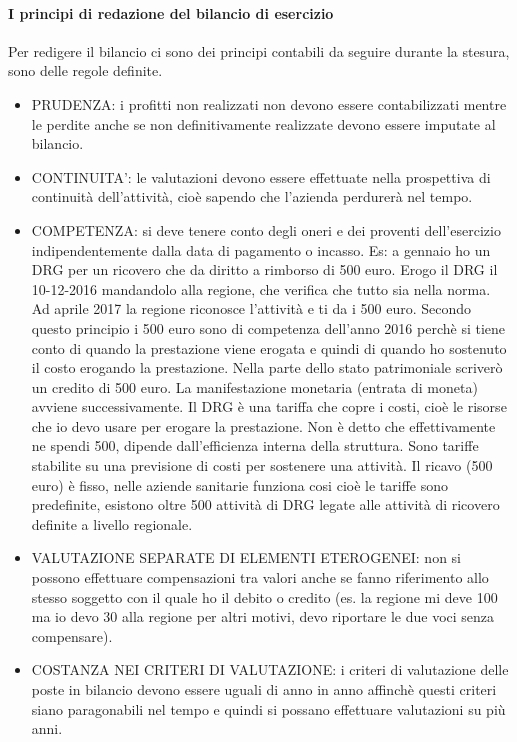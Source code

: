 \paragraph{I principi di redazione del bilancio di esercizio}

Per redigere il bilancio ci sono dei principi contabili da seguire
durante la stesura, sono delle regole definite.

\begin{itemize}
\item
  PRUDENZA: i profitti non realizzati non devono essere contabilizzati
  mentre le perdite anche se non definitivamente realizzate devono
  essere imputate al bilancio.
\item
  CONTINUITA': le valutazioni devono essere effettuate nella prospettiva
  di continuità dell'attività, cioè sapendo che l'azienda perdurerà nel
  tempo.
\item
  COMPETENZA: si deve tenere conto degli oneri e dei proventi
  dell'esercizio indipendentemente dalla data di pagamento o incasso.
  Es: a gennaio ho un DRG per un ricovero che da diritto a rimborso di
  500 euro. Erogo il DRG il 10-12-2016 mandandolo alla regione, che
  verifica che tutto sia nella norma. Ad aprile 2017 la regione
  riconosce l'attività e ti da i 500 euro. Secondo questo principio i
  500 euro sono di competenza dell'anno 2016 perchè si tiene conto di
  quando la prestazione viene erogata e quindi di quando ho sostenuto il
  costo erogando la prestazione. Nella parte dello stato patrimoniale
  scriverò un credito di 500 euro. La manifestazione monetaria (entrata
  di moneta) avviene successivamente. Il DRG è una tariffa che copre i
  costi, cioè le risorse che io devo usare per erogare la prestazione.
  Non è detto che effettivamente ne spendi 500, dipende dall'efficienza
  interna della struttura. Sono tariffe stabilite su una previsione di
  costi per sostenere una attività. Il ricavo (500 euro) è fisso, nelle
  aziende sanitarie funziona cosi cioè le tariffe sono predefinite,
  esistono oltre 500 attività di DRG legate alle attività di ricovero
  definite a livello regionale.
\item
  VALUTAZIONE SEPARATE DI ELEMENTI ETEROGENEI: non si possono effettuare
  compensazioni tra valori anche se fanno riferimento allo stesso
  soggetto con il quale ho il debito o credito (es. la regione mi deve
  100 ma io devo 30 alla regione per altri motivi, devo riportare le due
  voci senza compensare).
\item
  COSTANZA NEI CRITERI DI VALUTAZIONE: i criteri di valutazione delle
  poste in bilancio devono essere uguali di anno in anno affinchè questi
  criteri siano paragonabili nel tempo e quindi si possano effettuare
  valutazioni su più anni.
\end{itemize}

